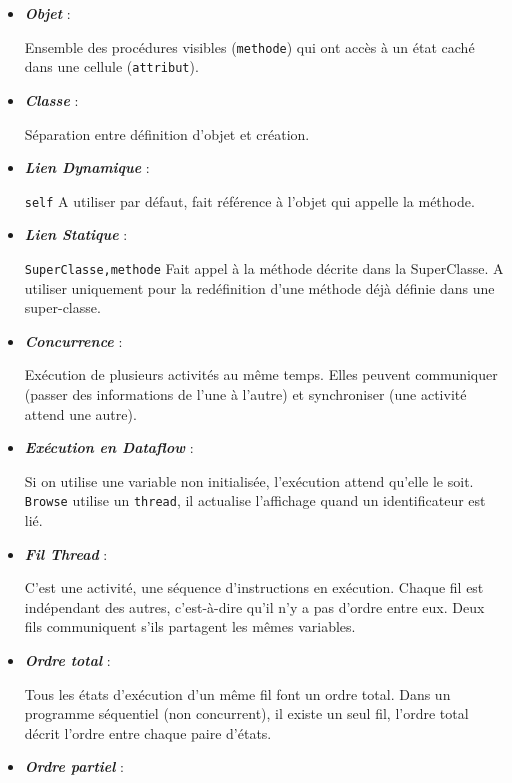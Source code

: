 \begin{itemize}
  \item \textbf{\textit{Objet}} :

    Ensemble des procédures visibles (\verb$methode$) qui ont accès à un état caché dans une cellule (\verb$attribut$).

  \item \textbf{\textit{Classe}} :

    Séparation entre définition d'objet et création.

  \item \textbf{\textit{Lien Dynamique}} :

    \verb$self$ A utiliser par défaut, fait référence à l'objet qui appelle la méthode.

  \item \textbf{\textit{Lien Statique}} :

    \verb$SuperClasse,methode$ Fait appel à la méthode décrite dans la SuperClasse. A utiliser uniquement pour la redéfinition d'une méthode déjà définie dans une super-classe.

  \item \textbf{\textit{Concurrence}} :

    Exécution de plusieurs activités au même temps. Elles peuvent communiquer (passer des informations de l'une à l'autre) et synchroniser (une activité attend une autre).

  \item \textbf{\textit{Exécution en Dataflow}} :

    Si on utilise une variable non initialisée, l'exécution attend qu'elle le soit. \verb$Browse$ utilise un \verb$thread$, il actualise l'affichage quand un identificateur est lié.

  \item \textbf{\textit{Fil Thread}} :

    C'est une activité, une séquence d'instructions en exécution. Chaque fil est indépendant des autres, c'est-à-dire qu'il n'y a pas d'ordre entre eux. Deux fils communiquent s'ils partagent les mêmes variables.

  \item \textbf{\textit{Ordre total}} :

    Tous les états d'exécution d'un même fil font un ordre total. Dans un programme séquentiel (non concurrent), il existe un seul fil, l'ordre total décrit l'ordre entre chaque paire d'états.

  \item \textbf{\textit{Ordre partiel}} :


\end{itemize}
